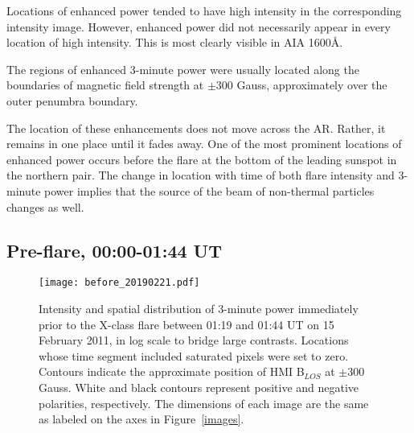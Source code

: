 Locations of enhanced power tended to have high intensity in
the corresponding intensity image.
However, enhanced power did not necessarily appear in
every location of high intensity.
This is most clearly visible in AIA 1600\AA{}.


The regions of enhanced 3-minute power
were usually located along the boundaries of magnetic field
strength at $\pm$300 Gauss,
approximately over the outer penumbra boundary.

The location of these enhancements does not move across the AR.
Rather, it remains in one place until it fades away.
One of the most prominent locations of enhanced power occurs before
the flare at the bottom of the leading sunspot in the northern pair.
The change in location with time of both flare intensity and 3-minute power
implies that the source of the beam of non-thermal particles changes as well.



\clearpage
\subsection{Pre-flare, 00:00-01:44 UT}


\begin{figure*}[htb!]\centering
    \texttt{[image: before\_20190221.pdf]}
    \caption{%
        Intensity and spatial distribution of 3-minute power
        immediately prior to the X-class flare between
        01:19 and 01:44 UT on 15 February 2011,
        in log scale to bridge large contrasts.
        Locations whose time segment included saturated pixels were set to zero.
        Contours indicate the approximate position of
        HMI B$_{LOS}$ at $\pm$300 Gauss. White and black contours represent
        positive and negative polarities, respectively.
        The dimensions of each image are the same as labeled
        on the axes in Figure~\ref{images}.
        \label{before}}
\end{figure*}

